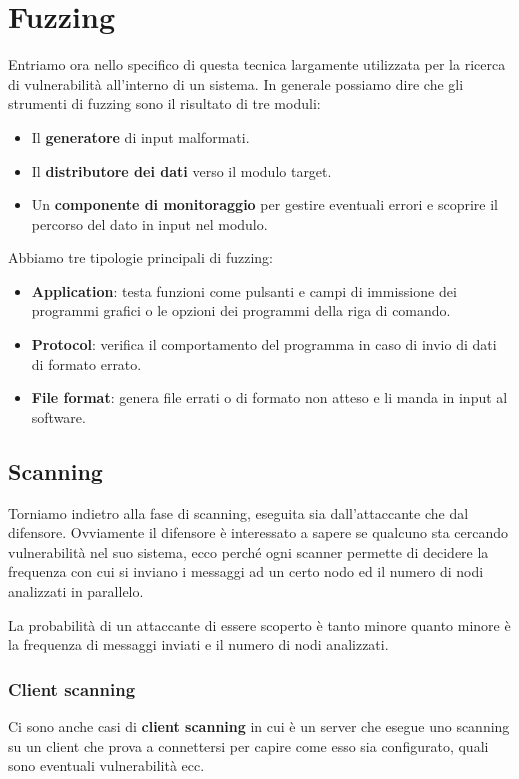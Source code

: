 \section{Fuzzing}
Entriamo ora nello specifico di questa tecnica largamente utilizzata per la ricerca di vulnerabilità all'interno di un
sistema. In generale possiamo dire che gli strumenti di fuzzing sono il risultato di tre moduli:
\begin{itemize}
	\item Il \textbf{generatore} di input malformati.
	\item Il \textbf{distributore dei dati} verso il modulo target.
	\item Un \textbf{componente di monitoraggio} per gestire eventuali errori e scoprire il percorso del dato in input
	      nel modulo.
\end{itemize}
Abbiamo tre tipologie principali di fuzzing:
\begin{itemize}
	\item \textbf{Application}: testa funzioni come pulsanti e campi di immissione dei programmi grafici o le opzioni
	      dei programmi della riga di comando.
	\item \textbf{Protocol}: verifica il comportamento del programma in caso di invio di dati di formato errato.
	\item \textbf{File format}: genera file errati o di formato non atteso e li manda in input al software.
\end{itemize}

\subsection{Scanning}
Torniamo indietro alla fase di scanning, eseguita sia dall'attaccante che dal difensore. Ovviamente il difensore è
interessato a sapere se qualcuno sta cercando vulnerabilità nel suo sistema, ecco perché ogni scanner permette di
decidere la frequenza con cui si inviano i messaggi ad un certo nodo ed il numero di nodi analizzati in parallelo.

La probabilità di un attaccante di essere scoperto è tanto minore quanto minore è la frequenza di messaggi inviati e
il numero di nodi analizzati.

\subsubsection{Client scanning}
Ci sono anche casi di \textbf{client scanning} in cui è un server che esegue uno scanning su un client che prova a
connettersi per capire come esso sia configurato, quali sono eventuali vulnerabilità ecc.

